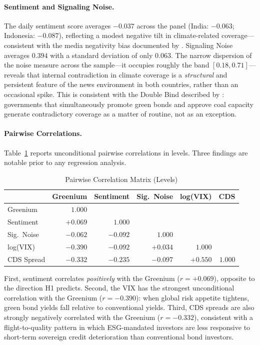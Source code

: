 \documentclass[12pt,a4paper]{article}
\begin{document}
\paragraph{Sentiment and Signaling Noise.}
The daily sentiment score averages $-0.037$ across the panel (India: $-0.063$; Indonesia: $-0.087$), reflecting a modest negative tilt in climate-related coverage---consistent with the media negativity bias documented by \citet{Soroka2015}. Signaling Noise averages $0.394$ with a standard deviation of only $0.063$. The narrow dispersion of the noise measure across the sample---it occupies roughly the band $[0.18, 0.71]$---reveals that internal contradiction in climate coverage is a \textit{structural} and persistent feature of the news environment in both countries, rather than an occasional spike. This is consistent with the Double Bind described by \citet{Neumann2025}: governments that simultaneously promote green bonds and approve coal capacity generate contradictory coverage as a matter of routine, not as an exception.

\paragraph{Pairwise Correlations.}
Table~\ref{tab:corr} reports unconditional pairwise correlations in levels. Three findings are notable prior to any regression analysis.

\begin{table}[H]
\centering
\caption{Pairwise Correlation Matrix (Levels)}
\label{tab:corr}
\small
\begin{tabular}{lrrrrr}
\toprule
 & \textbf{Greenium} & \textbf{Sentiment} & \textbf{Sig.\ Noise} & \textbf{log(VIX)} & \textbf{CDS} \\
\midrule
Greenium       & $1.000$  &          &          &          & \\
Sentiment      & $+0.069$ & $1.000$  &          &          & \\
Sig.\ Noise    & $-0.062$ & $-0.092$ & $1.000$  &          & \\
log(VIX)       & $-0.390$ & $-0.092$ & $+0.034$ & $1.000$  & \\
CDS Spread     & $-0.332$ & $-0.235$ & $-0.097$ & $+0.550$ & $1.000$ \\
\bottomrule
\end{tabular}
\end{table}

First, sentiment correlates \textit{positively} with the Greenium ($r = +0.069$), opposite to the direction H1 predicts. Second, the VIX has the strongest unconditional correlation with the Greenium ($r = -0.390$): when global risk appetite tightens, green bond yields fall relative to conventional yields. Third, CDS spreads are also strongly negatively correlated with the Greenium ($r = -0.332$), consistent with a flight-to-quality pattern in which ESG-mandated investors are less responsive to short-term sovereign credit deterioration than conventional bond investors.
\end{document}
